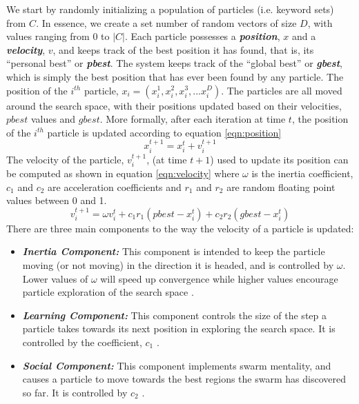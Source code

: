 \documentclass[runningheads]{llncs}
\begin{document}
We start by randomly initializing a population of particles (i.e. keyword sets) from $C$. In essence, we create a set number of random vectors of size $D$, with values ranging from $0$ to $|C|$. Each particle possesses a \textit{\textbf{position}}, $x$ and a \textit{\textbf{velocity}}, $v$, and keeps track of the best position it has found, that is, its ``personal best'' or \textit{\textbf{pbest}}. The system keeps track of the ``global best'' or \textit{\textbf{gbest}}, which is simply the best position that has ever been found by any particle. The position of the $i^{th}$ particle, $x_i = (x_i^1, x_i^2, x_i^3, ... x_i^D)$. The particles are all moved around the search space, with their positions updated based on their velocities, $pbest$ values and $gbest$. More formally, after each iteration at time $t$, the position of the $i^{th}$ particle is updated according to equation \ref{eqn:position} 
\begin{equation}
	x_i^{t+1} = x_i^t + v_i^{t+1}
	\label{eqn:position}
\end{equation}
The velocity of the particle, $v_i^{t+1}$, (at time $t+1$) used to update its position can be computed as shown in equation \ref{eqn:velocity} where $\omega$ is the inertia coefficient, $c_1$ and $c_2$ are acceleration coefficients and $r_1$ and $r_2$ are random floating point values between 0 and 1.
\begin{equation}
	v_i^{t+1} = \omega v_i^t + c_1r_1(pbest - x_i^t) + c_2r_2(gbest - x_i^t) 
	\label{eqn:velocity}
\end{equation}
There are three main components to the way the velocity of a particle is updated:
\begin{itemize}
	\item \textit{\textbf{Inertia Component:}} This component is intended to keep the particle moving (or not moving) in the direction it is headed, and is controlled by $\omega$. Lower values of $\omega$ will speed up convergence while higher values encourage particle exploration of the search space \cite{K_REF3}.
	
	\item \textit{\textbf{Learning Component:}} This component controls the size of the step a particle takes towards its next position in exploring the search space. It is controlled by the coefficient, $c_1$ \cite{K_REF4}. 
	
	\item \textit{\textbf{Social Component:}} This component implements swarm mentality, and causes a particle to move towards the best regions the swarm has discovered so far. It is controlled by $c_2$  \cite{K_REF4}.
\end{itemize}
\end{document}
